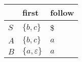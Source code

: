 \documentclass{standalone}
\providecommand\lightrule{%
	\arrayrulecolor{black!30}%
	\midrule[\lightrulewidth]%
	\arrayrulecolor{black}}
\begin{document}
\begin{tabularx}{\textwidth}{XXX}
     & first & follow\\
    \midrule
        \(S\)
        &
        \(\{b, c\}\)
        &
        \$
        \\ \lightrule
        \(A\)
        &
        \(\{b, c\}\)
        &
        \(a\)
        \\ \lightrule
        \(B\)
        &
        \(\{a, \varepsilon\}\)
        &
        \(a\)
\end{tabularx}
\end{document}
